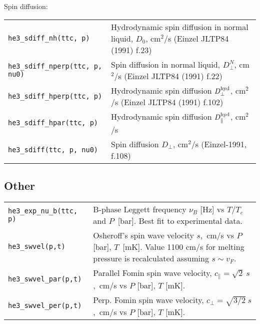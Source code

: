 \documentclass[a4paper]{article}
\begin{document}
Spin diffusion:

\medskip
\noindent\begin{tabular}{lp{12.5cm}}
\tt he3\_sdiff\_nh(ttc, p)    & Hydrodynamic spin diffusion in normal liquid, $D_0$, cm$^2$/s\newline
                              {\small (Einzel JLTP84 (1991) f.23)}\\
\tt he3\_sdiff\_nperp(ttc, p, nu0) & Spin diffusion in normal liquid, $D^N_\perp$, cm$^2$/s\newline
                              {\small (Einzel JLTP84 (1991) f.22)}\\
\tt he3\_sdiff\_hperp(ttc, p) & Hydrodynamic spin diffusion $D_\perp^{\rm hyd}$, cm$^2$/s
                              {(\small Einzel JLTP84 (1991) f.102)}\\
\tt he3\_sdiff\_hpar(ttc, p)  & Hydrodynamic spin diffusion $D_\parallel^{\rm hyd}$, cm$^2$/s\\
\tt he3\_sdiff(ttc, p, nu0)   & Spin diffusion $D_\perp$, cm$^2$/s
                              {\small(Einzel-1991, f.108)}\\
\end{tabular}
\medskip


\subsection*{Other}

\medskip
\noindent\begin{tabular}{lp{12.5cm}}
\tt he3\_exp\_nu\_b(ttc, p)     &B-phase Leggett frequency $\nu_B$ [Hz] vs
                                 $T/T_c$ and $P$~[bar].\newline
                                  Best fit to experimental data.\\
\tt he3\_swvel(p,t) & Osheroff's spin wave velocity $s$,~cm/s
                      vs $P$ [bar], $T$~[mK]. Value 1100 cm/s for
                      melting pressure is recalculated assuming $s\sim v_F$.\\
\tt he3\_swvel\_par(p,t) & Parallel Fomin spin wave velocity,\newline
                          $c_\parallel = \sqrt{2}\ s$,~cm/s vs $P$ [bar], $T$ [mK].\\
\tt he3\_swvel\_per(p,t) & Perp. Fomin spin wave velocity,\newline
                          $c_\perp = \sqrt{3/2}\ s$,~cm/s vs $P$ [bar], $T$ [mK].\\

\end{tabular}
\medskip

\end{document}
